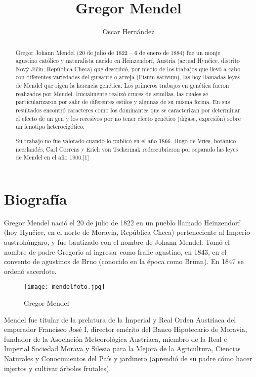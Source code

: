 \documentclass{report}
\title{Gregor Mendel}
\author{Oscar Hernández}
\begin{document}
\maketitle

\begin{abstract}
Gregor Johann Mendel (20 de julio de 1822 – 6 de enero de 1884) fue un monje agustino católico y naturalista nacido en Heinzendorf, Austria (actual Hynčice, distrito Nový Jičín, República Checa) que describió, por medio de los trabajos que llevó a cabo con diferentes variedades del guisante o arveja (Pisum sativum), las hoy llamadas leyes de Mendel que rigen la herencia genética. Los primeros trabajos en genética fueron realizados por Mendel. Inicialmente realizó cruces de semillas, las cuales se particularizaron por salir de diferentes estilos y algunas de su misma forma. En sus resultados encontró caracteres como los dominantes que se caracterizan por determinar el efecto de un gen y los recesivos por no tener efecto genético (dígase, expresión) sobre un fenotipo heterocigótico.

Su trabajo no fue valorado cuando lo publicó en el año 1866. Hugo de Vries, botánico neerlandés, Carl Correns y Erich von Tschermak redescubrieron por separado las leyes de Mendel en el año 1900.[1]
\end{abstract}

\tableofcontents

\chapter{Biografía}

Gregor Mendel nació el 20 de julio de 1822 en un pueblo llamado Heinzendorf (hoy Hynčice, en el norte de Moravia, República Checa) perteneciente al Imperio austrohúngaro, y fue bautizado con el nombre de Johann Mendel. Tomó el nombre de padre Gregorio al ingresar como fraile agustino, en 1843, en el convento de agustinos de Brno (conocido en la época como Brünn). En 1847 se ordenó sacerdote.

\begin{figure}[h!]
\centering
\texttt{[image: mendelfoto.jpg]}
\caption{Gregor Mendel}
\label{capMendel}
\end{figure}

Mendel fue titular de la prelatura de la Imperial y Real Orden Austriaca del emperador Francisco José I, director emérito del Banco Hipotecario de Moravia, fundador de la Asociación Meteorológica Austriaca, miembro de la Real e Imperial Sociedad Morava y Silesia para la Mejora de la Agricultura, Ciencias Naturales y Conocimientos del País y jardinero (aprendió de su padre cómo hacer injertos y cultivar árboles frutales).
\end{document}
